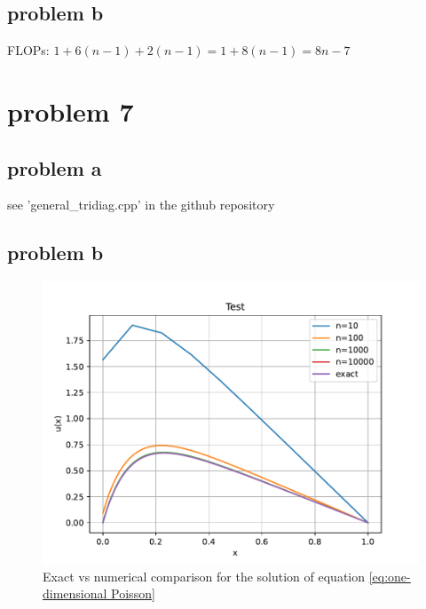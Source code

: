 \documentclass[english,notitlepage]{revtex4-1}  %
\begin{document}
	\subsection*{problem b}
FLOPs: $1 + 6(n-1) + 2(n-1) = 1 + 8(n-1) = 8n - 7$

\section*{problem 7}
	\subsection*{problem a}
see 'general\_tridiag.cpp' in the github repository
   \subsection*{problem b}
	   \begin{figure}[H]
	   	\centering
	   	\includegraphics[scale=0.55]{plots/gen_tri_cmp_exact.pdf} %
	   	\caption{Exact vs numerical comparison for the solution of equation \ref{eq:one-dimensional Poisson}}
	   	\label{fig:Exact vs approx Poisson }
	   \end{figure}
\end{document}
